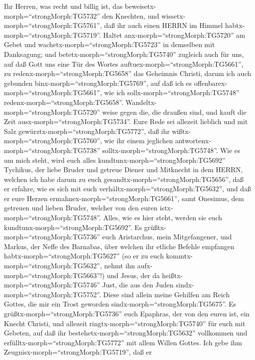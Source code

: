 Ihr Herren, was recht und billig ist, das
beweisetx-morph=``strongMorph:TG5732'' den Knechten, und
wissetx-morph=``strongMorph:TG5761'', daß ihr auch einen HERRN im Himmel
habtx-morph=``strongMorph:TG5719''.  Haltet
anx-morph=``strongMorph:TG5720'' am Gebet und
wachetx-morph=``strongMorph:TG5723'' in demselben mit Danksagung;
 und betetx-morph=``strongMorph:TG5740'' zugleich auch für
uns, auf daß Gott uns eine Tür des Wortes
auftuex-morph=``strongMorph:TG5661'', zu
redenx-morph=``strongMorph:TG5658'' das Geheimnis Christi, darum ich
auch gebunden binx-morph=``strongMorph:TG5769'',  auf daß
ich es offenbarex-morph=``strongMorph:TG5661'', wie ich
sollx-morph=``strongMorph:TG5748'' redenx-morph=``strongMorph:TG5658''.
 Wandeltx-morph=``strongMorph:TG5720'' weise gegen die, die
draußen sind, und kauft die Zeit ausx-morph=``strongMorph:TG5734''.
 Eure Rede sei allezeit lieblich und mit Salz
gewürztx-morph=``strongMorph:TG5772'', daß ihr
wißtx-morph=``strongMorph:TG5760'', wie ihr einem jeglichen
antwortenx-morph=``strongMorph:TG5738''
solltx-morph=``strongMorph:TG5748''.  Wie es um mich steht,
wird euch alles kundtunx-morph=``strongMorph:TG5692'' Tychikus, der
liebe Bruder und getreue Diener und Mitknecht in dem HERRN, 
welchen ich habe darum zu euch gesandtx-morph=``strongMorph:TG5656'',
daß er erfahre, wie es sich mit euch
verhältx-morph=``strongMorph:TG5632'', und daß er eure Herzen
ermahnex-morph=``strongMorph:TG5661'',  samt Onesimus, dem
getreuen und lieben Bruder, welcher von den euren
istx-morph=``strongMorph:TG5748''. Alles, wie es hier steht, werden sie
euch kundtunx-morph=``strongMorph:TG5692''.  Es
grüßtx-morph=``strongMorph:TG5736'' euch Aristarchus, mein
Mitgefangener, und Markus, der Neffe des Barnabas, über welchen ihr
etliche Befehle empfangen habtx-morph=``strongMorph:TG5627'' (so er zu
euch kommtx-morph=``strongMorph:TG5632'', nehmt ihn
aufx-morph=``strongMorph:TG5663''!)  und Jesus, der da
heißtx-morph=``strongMorph:TG5746'' Just, die aus den Juden
sindx-morph=``strongMorph:TG5752''. Diese sind allein meine Gehilfen am
Reich Gottes, die mir ein Trost geworden
sindx-morph=``strongMorph:TG5675''.  Es
grüßtx-morph=``strongMorph:TG5736'' euch Epaphras, der von den euren
ist, ein Knecht Christi, und allezeit
ringtx-morph=``strongMorph:TG5740'' für euch mit Gebeten, auf daß ihr
bestehetx-morph=``strongMorph:TG5632'' vollkommen und
erfülltx-morph=``strongMorph:TG5772'' mit allem Willen Gottes.
 Ich gebe ihm Zeugnisx-morph=``strongMorph:TG5719'', daß er
